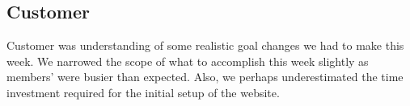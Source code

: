 \documentclass[12pt]{article}
\begin{document}
		\subsection{Customer}
		Customer was understanding of some realistic goal changes we had to make this week. We narrowed the scope of what to accomplish this week slightly as members’ were busier than expected. Also, we perhaps underestimated the time investment required for the initial setup of the website.

	
\end{document}
